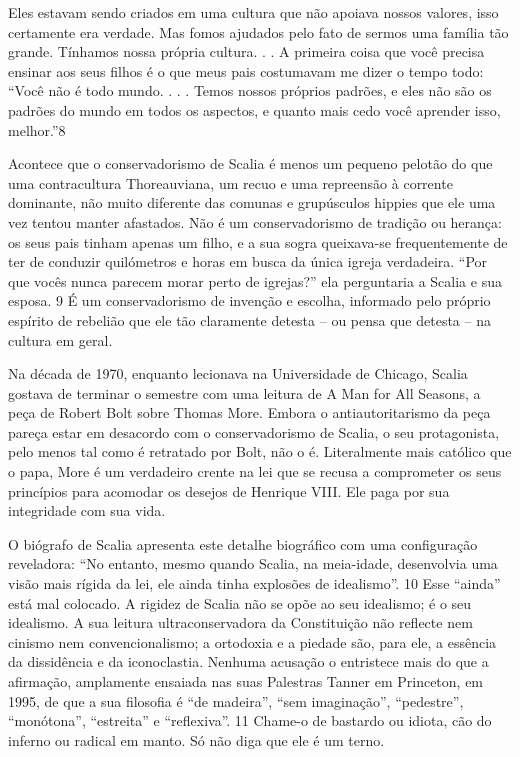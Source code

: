  \par 
Eles estavam sendo criados em uma cultura que não apoiava nossos valores, isso certamente era verdade. Mas fomos ajudados pelo fato de sermos uma família tão grande. Tínhamos nossa própria cultura. . . A primeira coisa que você precisa ensinar aos seus filhos é o que meus pais costumavam me dizer o tempo todo: “Você não é todo mundo. . . . Temos nossos próprios padrões, e eles não são os padrões do mundo em todos os aspectos, e quanto mais cedo você aprender isso, melhor.”{\color{blue}8}
 \par 
Acontece que o conservadorismo de Scalia é menos um pequeno pelotão do que uma contracultura Thoreauviana, um recuo e uma repreensão à corrente dominante, não muito diferente das comunas e grupúsculos hippies que ele uma vez tentou manter afastados. Não é um conservadorismo de tradição ou herança: os seus pais tinham apenas um filho, e a sua sogra queixava-se frequentemente de ter de conduzir quilómetros e horas em busca da única igreja verdadeira. “Por que vocês nunca parecem morar perto de igrejas?” ela perguntaria a Scalia e sua esposa. {\color{blue}9} É um conservadorismo de invenção e escolha, informado pelo próprio espírito de rebelião que ele tão claramente detesta – ou pensa que detesta – na cultura em geral.
 \par 
Na década de 1970, enquanto lecionava na Universidade de Chicago, Scalia gostava de terminar o semestre com uma leitura de A Man for All Seasons, a peça de Robert Bolt sobre Thomas More. Embora o antiautoritarismo da peça pareça estar em desacordo com o conservadorismo de Scalia, o seu protagonista, pelo menos tal como é retratado por Bolt, não o é. Literalmente mais católico que o papa, More é um verdadeiro crente na lei que se recusa a comprometer os seus princípios para acomodar os desejos de Henrique VIII. Ele paga por sua integridade com sua vida.
 \par 
O biógrafo de Scalia apresenta este detalhe biográfico com uma configuração reveladora: “No entanto, mesmo quando Scalia, na meia-idade, desenvolvia uma visão mais rígida da lei, ele ainda tinha explosões de idealismo”. {\color{blue}10} Esse “ainda” está mal colocado. A rigidez de Scalia não se opõe ao seu idealismo; é o seu idealismo. A sua leitura ultraconservadora da Constituição não reflecte nem cinismo nem convencionalismo; a ortodoxia e a piedade são, para ele, a essência da dissidência e da iconoclastia. Nenhuma acusação o entristece mais do que a afirmação, amplamente ensaiada nas suas Palestras Tanner em Princeton, em 1995, de que a sua filosofia é “de madeira”, “sem imaginação”, “pedestre”, “monótona”, “estreita” e “reflexiva”. {\color{blue}11} Chame-o de bastardo ou idiota, cão do inferno ou radical em manto. Só não diga que ele é um terno.
